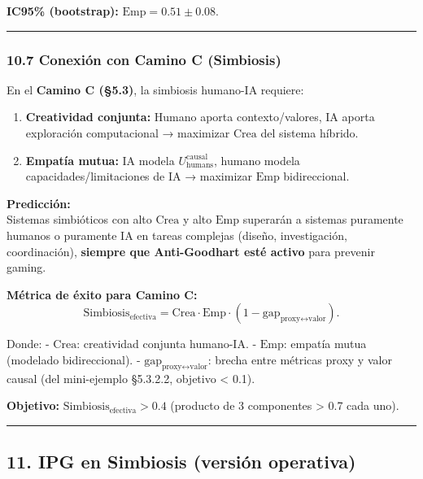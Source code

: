 \textbf{IC95\% (bootstrap):} \(\text{Emp} = 0.51 \pm 0.08\).

\begin{center}\rule{0.5\linewidth}{0.5pt}\end{center}

\subsubsection{10.7 Conexión con Camino C
(Simbiosis)}\label{conexiuxf3n-con-camino-c-simbiosis}

En el \textbf{Camino C (§5.3)}, la simbiosis humano-IA requiere:

\begin{enumerate}
\def\labelenumi{\arabic{enumi}.}
\tightlist
\item
  \textbf{Creatividad conjunta:} Humano aporta contexto/valores, IA
  aporta exploración computacional → maximizar \(\text{Crea}\) del
  sistema híbrido.
\item
  \textbf{Empatía mutua:} IA modela
  \(U_{\text{humans}}^{\text{causal}}\), humano modela
  capacidades/limitaciones de IA → maximizar \(\text{Emp}\)
  bidireccional.
\end{enumerate}

\textbf{Predicción:}\\
Sistemas simbióticos con alto \(\text{Crea}\) y alto \(\text{Emp}\)
superarán a sistemas puramente humanos o puramente IA en tareas
complejas (diseño, investigación, coordinación), \textbf{siempre que
Anti-Goodhart esté activo} para prevenir gaming.

\textbf{Métrica de éxito para Camino C:} \[
\text{Simbiosis}_{\text{efectiva}} = \text{Crea} \cdot \text{Emp} \cdot (1 - \text{gap}_{\text{proxy}\leftrightarrow\text{valor}}).
\]

Donde: - \(\text{Crea}\): creatividad conjunta humano-IA. -
\(\text{Emp}\): empatía mutua (modelado bidireccional). -
\(\text{gap}_{\text{proxy}\leftrightarrow\text{valor}}\): brecha entre
métricas proxy y valor causal (del mini-ejemplo §5.3.2.2, objetivo
\textless{} 0.1).

\textbf{Objetivo:} \(\text{Simbiosis}_{\text{efectiva}} > 0.4\)
(producto de 3 componentes \textgreater{} 0.7 cada uno).

\begin{center}\rule{0.5\linewidth}{0.5pt}\end{center}

\subsection{11. IPG en Simbiosis (versión
operativa)}\label{ipg-en-simbiosis-versiuxf3n-operativa}


